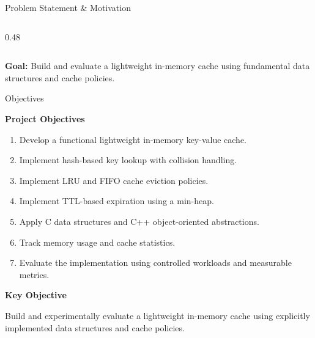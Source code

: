 \documentclass[aspectratio=169,10pt]{beamer}
\begin{document}
\begin{frame}{Problem Statement \& Motivation}
\begin{columns}[T]
\begin{column}{0.48\textwidth}
\end{column}

\end{columns}

\vspace{1mm}

\begin{center}

\colorbox{GEULightBlue}{
\parbox{0.78\textwidth}{
\centering
\textbf{\color{GEUBlue}Goal:}
Build and evaluate a lightweight in-memory cache using
fundamental data structures and cache policies.
}}

\end{center}

\end{frame}


\begin{frame}{Objectives}

\textbf{\color{GEUBlue}Project Objectives}

\vspace{2mm}

\begin{enumerate}

\item Develop a functional lightweight in-memory key-value cache.

\item Implement hash-based key lookup with collision handling.

\item Implement LRU and FIFO cache eviction policies.

\item Implement TTL-based expiration using a min-heap.

\item Apply C data structures and C++ object-oriented abstractions.

\item Track memory usage and cache statistics.

\item Evaluate the implementation using controlled workloads
and measurable metrics.

\end{enumerate}

\vfill

\begin{center}

\colorbox{GEULightBlue}{
\parbox{0.82\textwidth}{
\centering
\textbf{\color{GEUBlue}Key Objective}

\vspace{1mm}

Build and experimentally evaluate a lightweight in-memory cache
using explicitly implemented data structures and cache policies.

}}

\end{center}

\end{frame}
\end{document}

